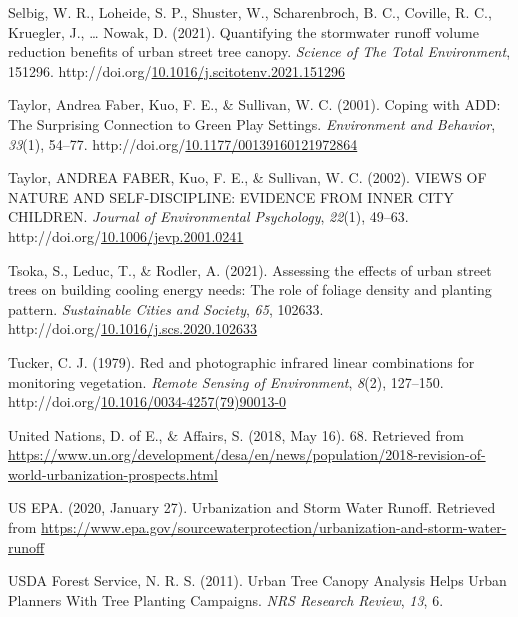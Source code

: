 \documentclass[12pt,twoside]{reedthesis}
\newlength{\cslhangindent}
\newenvironment{CSLReferences}[2] %
 {%
  \setlength{\parindent}{0pt}
  \ifodd #1 \everypar{\setlength{\hangindent}{\cslhangindent}}\ignorespaces\fi
  \ifnum #2 > 0
  \setlength{\parskip}{#2\baselineskip}
  \fi
 }%
 {}
\begin{document}
\begin{CSLReferences}{1}{0}
\leavevmode{}%
Selbig, W. R., Loheide, S. P., Shuster, W., Scharenbroch, B. C., Coville, R. C., Kruegler, J., \ldots{} Nowak, D. (2021). Quantifying the stormwater runoff volume reduction benefits of urban street tree canopy. \emph{Science of The Total Environment}, 151296. http://doi.org/\href{https://doi.org/10.1016/j.scitotenv.2021.151296}{10.1016/j.scitotenv.2021.151296}

\leavevmode{}%
Taylor, Andrea Faber, Kuo, F. E., \& Sullivan, W. C. (2001). Coping with ADD: The Surprising Connection to Green Play Settings. \emph{Environment and Behavior}, \emph{33}(1), 54--77. http://doi.org/\href{https://doi.org/10.1177/00139160121972864}{10.1177/00139160121972864}

\leavevmode{}%
Taylor, ANDREA FABER, Kuo, F. E., \& Sullivan, W. C. (2002). VIEWS OF NATURE AND SELF-DISCIPLINE: EVIDENCE FROM INNER CITY CHILDREN. \emph{Journal of Environmental Psychology}, \emph{22}(1), 49--63. http://doi.org/\href{https://doi.org/10.1006/jevp.2001.0241}{10.1006/jevp.2001.0241}

\leavevmode{}%
Tsoka, S., Leduc, T., \& Rodler, A. (2021). Assessing the effects of urban street trees on building cooling energy needs: The role of foliage density and planting pattern. \emph{Sustainable Cities and Society}, \emph{65}, 102633. http://doi.org/\href{https://doi.org/10.1016/j.scs.2020.102633}{10.1016/j.scs.2020.102633}

\leavevmode{}%
Tucker, C. J. (1979). Red and photographic infrared linear combinations for monitoring vegetation. \emph{Remote Sensing of Environment}, \emph{8}(2), 127--150. http://doi.org/\href{https://doi.org/10.1016/0034-4257(79)90013-0}{10.1016/0034-4257(79)90013-0}

\leavevmode{}%
United Nations, D. of E., \& Affairs, S. (2018, May 16). 68. Retrieved from \url{https://www.un.org/development/desa/en/news/population/2018-revision-of-world-urbanization-prospects.html}

\leavevmode{}%
US EPA. (2020, January 27). Urbanization and Storm Water Runoff. Retrieved from \url{https://www.epa.gov/sourcewaterprotection/urbanization-and-storm-water-runoff}

\leavevmode{}%
USDA Forest Service, N. R. S. (2011). Urban Tree Canopy Analysis Helps Urban Planners With Tree Planting Campaigns. \emph{NRS Research Review}, \emph{13}, 6.


\end{CSLReferences}
\end{document}
